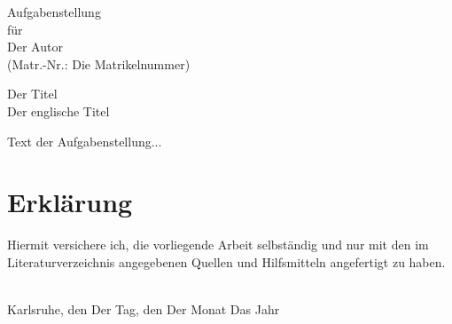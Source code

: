 \documentclass[12pt,a4paper,twoside]{book}
\newcommand{\Author}{Der Autor}
\newcommand{\Title}{Der Titel}
\newcommand{\EnglishTitle}{Der englische Titel}
\newcommand{\matrnr}{Die Matrikelnummer}
\begin{document}
	\clearemptydoublepage
	\pagestyle{titelblatt}
	\vspace*{2cm}
	\begin{center}

		{\large Aufgabenstellung\\
		für\\
		\Author\\
		(Matr.-Nr.: \matrnr)\par}
		\vspace{.2cm}

		{\Large \Title\\}
		\vspace{.2cm}
		{\Large \EnglishTitle}
		\vspace{1cm}

	\end{center}

	\noindent
	Text der Aufgabenstellung...


	\par




	\clearemptydoublepage
	\pagestyle{preamble}
	\section*{Erklärung}
	Hiermit versichere ich, die vorliegende Arbeit selbständig und nur mit den im Literaturverzeichnis angegebenen Quellen und Hilfsmitteln angefertigt zu haben.\par

	\vspace{3cm}
	\makebox[10cm]{\hrulefill}\\
	\noindent Karlsruhe, den Der Tag, den Der Monat Das Jahr\par

\end{document}
